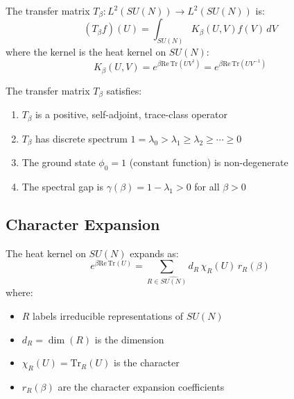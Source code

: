 \begin{definition}
\label{def:transfer-matrix}
The transfer matrix $T_\beta : L^2(SU(N)) \to L^2(SU(N))$ is:
\begin{equation}
(T_\beta f)(U) = \int_{SU(N)} K_\beta(U, V) f(V) \, dV
\end{equation}
where the kernel is the heat kernel on $SU(N)$:
\begin{equation}
K_\beta(U, V) = e^{\beta \mathrm{Re}\,\mathrm{Tr}(UV^\dagger)} = e^{\beta \mathrm{Re}\,\mathrm{Tr}(UV^{-1})}
\end{equation}
\end{definition}

\begin{theorem}
\label{thm:transfer-props}
The transfer matrix $T_\beta$ satisfies:
\begin{enumerate}
\item $T_\beta$ is a positive, self-adjoint, trace-class operator
\item $T_\beta$ has discrete spectrum $1 = \lambda_0 > \lambda_1 \geq \lambda_2 \geq \cdots \geq 0$
\item The ground state $\phi_0 = 1$ (constant function) is non-degenerate
\item The spectral gap is $\gamma(\beta) = 1 - \lambda_1 > 0$ for all $\beta > 0$
\end{enumerate}
\end{theorem}

\subsection{Character Expansion}

\begin{theorem}
\label{thm:character-expansion-117}
The heat kernel on $SU(N)$ expands as:
\begin{equation}
e^{\beta \mathrm{Re}\,\mathrm{Tr}(U)} = \sum_{R \in \widehat{SU(N)}} d_R \, \chi_R(U) \, r_R(\beta)
\end{equation}
where:
\begin{itemize}
\item $R$ labels irreducible representations of $SU(N)$
\item $d_R = \dim(R)$ is the dimension
\item $\chi_R(U) = \mathrm{Tr}_R(U)$ is the character
\item $r_R(\beta)$ are the character expansion coefficients
\end{itemize}
\end{theorem}

